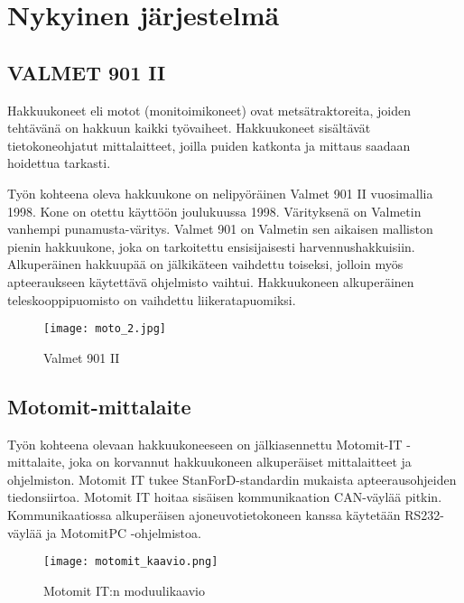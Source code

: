 \newpage

\chapter{Nykyinen järjestelmä}

\section{VALMET 901 II}

Hakkuukoneet eli motot (monitoimikoneet) ovat metsätraktoreita, joiden tehtävänä on hakkuun kaikki työvaiheet. Hakkuukoneet sisältävät tietokoneohjatut mittalaitteet, joilla puiden katkonta ja mittaus saadaan hoidettua tarkasti.

Työn kohteena oleva hakkuukone on nelipyöräinen Valmet 901 II vuosimallia 1998. Kone on otettu käyttöön joulukuussa 1998. Värityksenä on Valmetin vanhempi punamusta-väritys. Valmet 901 on Valmetin sen aikaisen malliston pienin hakkuukone, joka on tarkoitettu ensisijaisesti harvennushakkuisiin. Alkuperäinen hakkuupää on jälkikäteen vaihdettu toiseksi, jolloin myös apteeraukseen käytettävä ohjelmisto vaihtui. Hakkuukoneen alkuperäinen teleskooppipuomisto on vaihdettu liikeratapuomiksi.
\newline

\begin{figure}[H]
\centering
\texttt{[image: moto\_2.jpg]}
\caption{Valmet 901 II}
\end{figure}

\section{Motomit-mittalaite}

Työn kohteena olevaan hakkuukoneeseen on jälkiasennettu Motomit-IT -mittalaite, joka on korvannut hakkuukoneen alkuperäiset mittalaitteet ja ohjelmiston. Motomit IT tukee StanForD-standardin mukaista apteerausohjeiden tiedonsiirtoa. Motomit IT hoitaa sisäisen kommunikaation CAN-väylää pitkin. Kommunikaatiossa alkuperäisen ajoneuvotietokoneen kanssa käytetään RS232-väylää ja MotomitPC -ohjelmistoa. \cite{motomit:esite}
\newline

\begin{figure}[H]
\centering
\texttt{[image: motomit\_kaavio.png]}
\caption{Motomit IT:n moduulikaavio}
\end{figure}
\newpage

